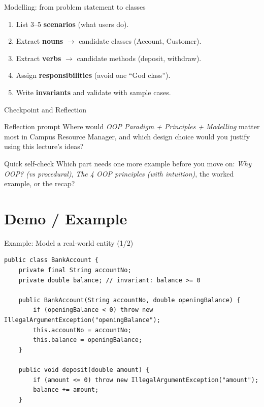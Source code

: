 \documentclass{beamer}
\begin{document}
\begin{frame}{Modelling: from problem statement to classes}
  \begin{enumerate}[<+->]
    \item List 3--5 \textbf{scenarios} (what users do).
    \item Extract \textbf{nouns} $\rightarrow$ candidate classes (Account, Customer).
    \item Extract \textbf{verbs} $\rightarrow$ candidate methods (deposit, withdraw).
    \item Assign \textbf{responsibilities} (avoid one ``God class'').
    \item Write \textbf{invariants} and validate with sample cases.
  \end{enumerate}
  \slidesources{\OOPSUnitISources}
\end{frame}

\begin{frame}{Checkpoint and Reflection}
\begin{block}{Reflection prompt}
Where would \textit{OOP Paradigm + Principles + Modelling} matter most in Campus Resource Manager, and which design choice would you justify using this lecture's ideas?
\end{block}
\begin{block}{Quick self-check}
Which part needs one more example before you move on: \textit{Why OOP? (vs procedural)}, \textit{The 4 OOP principles (with intuition)}, the worked example, or the recap?
\end{block}
  \slidesources{\OOPSUnitISources}
\end{frame}

\section{Demo / Example}
\label{sec:demo}

\begin{frame}[fragile,shrink=8]{Example: Model a real-world entity (1/2)}
\begin{lstlisting}
public class BankAccount {
    private final String accountNo;
    private double balance; // invariant: balance >= 0

    public BankAccount(String accountNo, double openingBalance) {
        if (openingBalance < 0) throw new IllegalArgumentException("openingBalance");
        this.accountNo = accountNo;
        this.balance = openingBalance;
    }

    public void deposit(double amount) {
        if (amount <= 0) throw new IllegalArgumentException("amount");
        balance += amount;
    }
\end{lstlisting}
  \slidesources{\OOPSUnitISources}
\end{frame}
\end{document}
